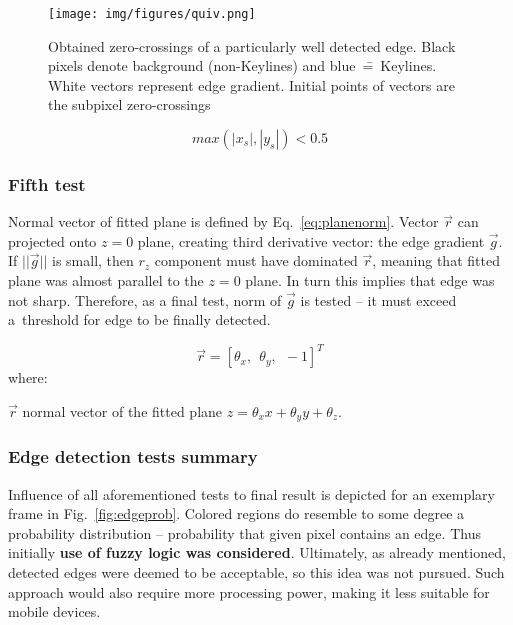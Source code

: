 \begin{figure}[ht]
	\centering\texttt{[image: img/figures/quiv.png]}
	\caption{ Obtained zero-crossings of a particularly well detected edge. Black pixels denote background (non-Keylines) and blue~\==~Keylines. White vectors represent edge gradient. Initial points of vectors are the subpixel zero-crossings }
	\label{fig:quiv}
\end{figure}

\begin{equation}
max(|x_s|, |y_s|) < 0.5
\label{eq:subpix_inside}
\end{equation}

\subsubsection{Fifth test}
\label{edge_fith}

Normal vector of fitted plane is defined by Eq.~\ref{eq:planenorm}. Vector $\vec{r}$ can projected onto $z=0$ plane, creating third derivative vector: the edge gradient $\vec{g}$. If $||\vec{g}||$ is small, then $r_{z}$ component must have dominated $\vec{r}$, meaning that fitted plane was almost parallel to the $z=0$ plane. In turn this implies that edge was not sharp. Therefore, as a final test, norm of $\vec{g}$ is tested -- it must exceed a~threshold for edge to be finally detected.

\begin{equation}
\vec{r} = [\theta_{x},\ \ \theta_{y},\ \ -1]^T
\label{eq:planenorm}
\end{equation}
where:
\begin{eqwhere}[2cm]
	\item[$\vec{r}$] normal vector of the fitted plane $z = \theta_{x}x + \theta_{y}y + \theta_{z}$.
\end{eqwhere}

\subsubsection{Edge detection tests summary}

Influence of all aforementioned tests to final result is depicted for an exemplary frame in Fig.~\ref{fig:edgeprob}. Colored regions do resemble to some degree a probability distribution -- probability that given pixel contains an edge. Thus initially \textbf{use of fuzzy logic was considered}. Ultimately, as already mentioned, detected edges were deemed to be acceptable, so this idea was not pursued. Such approach would also require more processing power, making it less suitable for mobile devices.

